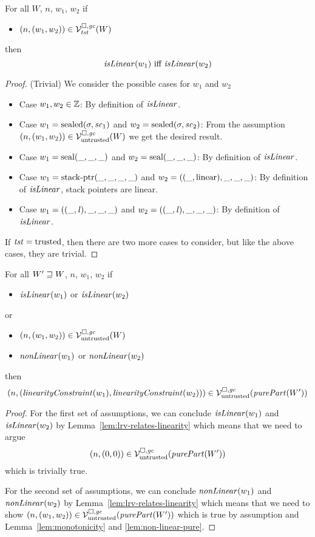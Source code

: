 \begin{lemma}
  \label{lem:lrv-relates-linearity}
  For all $W$, $n$, $w_1$, $w_2$ if
  \begin{itemize}
  \item $\npair{(w_1,w_2)} \in \lrvg{\trust}(W)$
  \end{itemize}
  then
  \[
    \isLinear{w_1} \text{ iff } \isLinear{w_2}
  \]
\end{lemma}
\begin{proof}
  (Trivial) We consider the possible cases for $w_1$ and $w_2$
  \begin{itemize}
  \item Case $w_1,w_2 \in \ints$: By definition of $\isLinear{}$.
  \item Case $w_1 = \sealed{\sigma,\vsc_1}$ and $w_2 = \sealed{\sigma,\vsc_2}$:
    From the assumption $\npair[n]{(w_1,w_2)} \in \lrv(W)$ we get the desired result.
  \item Case $w_1 = \seal{\_,\_,\_}$ and $w_2 = \seal{\_,\_,\_}$: By definition of $\isLinear{}$.
  \item Case $w_1 = \stkptr{\_,\_,\_,\_}$ and $w_2 = ((\_,\linear),\_,\_,\_)$: By definition of $\isLinear{}$, stack pointers are linear.
  \item Case $w_1 = ((\_,\lin),\_,\_,\_)$ and $w_2 = ((\_,\lin),\_,\_,\_)$: By definition of $\isLinear{}$.
  \end{itemize}
  If $\trust = \trusted$, then there are two more cases to consider, but like the above cases, they are trivial.
\end{proof}

\begin{lemma}
  \label{lem:lincons-lrv}
  For all $W' \future W$, $n$, $w_1$, $w_2$
   if
    \begin{itemize}
    \item $\isLinear{w_1}$ or $\isLinear{w_2}$
    \end{itemize} or
    \begin{itemize}
    \item $\npair{(w_1,w_2)} \in \lrv(W)$
    \item $\nonLinear{w_1}$ or $\nonLinear{w_2}$
    \end{itemize}
    then
    \[
      \npair{(\linCons{w_1},\linCons{w_2})} \in \lrv(\purePart{W'})
    \]
\end{lemma}
\begin{proof}
  For the first set of assumptions, we can conclude
  $\isLinear{w_1}$ and $\isLinear{w_2}$ by Lemma~\ref{lem:lrv-relates-linearity} which means that we need to argue
  \[
    \npair{(0,0)} \in \lrv(\purePart{W'})
  \]
  which is trivially true.

  For the second set of assumptions, we can conclude $\nonLinear{w_1}$ and
  $\nonLinear{w_2}$ by Lemma~\ref{lem:lrv-relates-linearity} which means that we
  need to show $\npair{(w_1,w_2)} \in \lrv(\purePart{W'})$ which is true by
  assumption and Lemma~\ref{lem:monotonicity} and \ref{lem:non-linear-pure}.
\end{proof}

